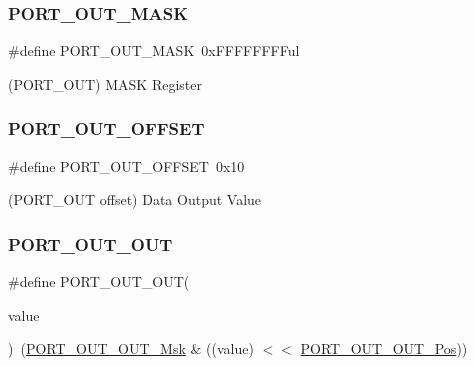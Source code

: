 \subsubsection{\texorpdfstring{PORT\_OUT\_MASK}{PORT\_OUT\_MASK}}
{\footnotesize\ttfamily \#define P\+O\+R\+T\+\_\+\+O\+U\+T\+\_\+\+M\+A\+SK~0x\+F\+F\+F\+F\+F\+F\+F\+Ful}



(P\+O\+R\+T\+\_\+\+O\+UT) M\+A\+SK Register 

\mbox{\label{group___s_a_m_d21___p_o_r_t_ga613c002dd1466d78b367184b2e8d5702}} 
\subsubsection{\texorpdfstring{PORT\_OUT\_OFFSET}{PORT\_OUT\_OFFSET}}
{\footnotesize\ttfamily \#define P\+O\+R\+T\+\_\+\+O\+U\+T\+\_\+\+O\+F\+F\+S\+ET~0x10}



(P\+O\+R\+T\+\_\+\+O\+UT offset) Data Output Value 

\mbox{\label{group___s_a_m_d21___p_o_r_t_ga089cc4f40a2dbf3abb393017317fdf5d}} 
\subsubsection{\texorpdfstring{PORT\_OUT\_OUT}{PORT\_OUT\_OUT}}
{\footnotesize\ttfamily \#define P\+O\+R\+T\+\_\+\+O\+U\+T\+\_\+\+O\+UT(\begin{DoxyParamCaption}\item[{}]{value }\end{DoxyParamCaption})~(\mbox{\hyperlink{group___s_a_m_d21___p_o_r_t_ga9c23adb5d24fc6e1b2f4eeaa5b14bfa6}{P\+O\+R\+T\+\_\+\+O\+U\+T\+\_\+\+O\+U\+T\+\_\+\+Msk}} \& ((value) $<$$<$ \mbox{\hyperlink{group___s_a_m_d21___p_o_r_t_ga2311d33aa22995c6371e1a7f8fbf4b8b}{P\+O\+R\+T\+\_\+\+O\+U\+T\+\_\+\+O\+U\+T\+\_\+\+Pos}}))}

\mbox{\label{group___s_a_m_d21___p_o_r_t_ga9c23adb5d24fc6e1b2f4eeaa5b14bfa6}} 
